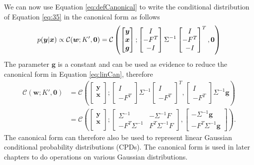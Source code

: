 \documentclass[12pt,oneside,openany,a4paper, %
afrikaans,english,
]{memoir}
\numberwithin{equation}{chapter}
\begin{document}
We can now use Equation \ref{eq:defCanonical} to write the conditional distribution of Equation \ref{eq:35} in the canonical form as follows
\begin{equation}\label{eq:linCan}
p(\bm{y}|\bm{x}) \propto \mathcal{C}(\bm{w}; K', \bm{0})\\
 =\mathcal{C}\left(
\begin{bmatrix}
\bm{y} \\
\bm{x} \\
\bm{g}
\end{bmatrix};
\begin{bmatrix}
I\\
-F^T\\
-I
\end{bmatrix}
\Sigma^{-1}
\begin{bmatrix}
I\\
-F^T\\
-I
\end{bmatrix}^T
, \bm{0}
\right)
\end{equation}
The parameter $\bm{g}$ is a constant and can be used as evidence to reduce the canonical form in Equation \ref{eq:linCan}, therefore
\begin{equation}\label{eq:conCanResult}
\begin{split}
\mathcal{C}(\bm{w}; K', \bm{0})& =\mathcal{C}\left(
\begin{bmatrix}
\bm{y} \\
\bm{x} \\
\end{bmatrix};
\begin{bmatrix}
I\\
-F^T
\end{bmatrix}
\Sigma^{-1}
\begin{bmatrix}
I\\
-F^T
\end{bmatrix}^T,
\begin{bmatrix}
I\\
-F^T
\end{bmatrix}
\Sigma^{-1}\bm{g}
\right)\\
& =\mathcal{C}\left(
\begin{bmatrix}
\bm{y} \\
\bm{x} \\
\end{bmatrix};
\begin{bmatrix}
\Sigma^{-1}  &  -\Sigma^{-1}F\\
-F^T\Sigma^{-1} & F^T\Sigma^{-1}F
\end{bmatrix}
, 
\begin{bmatrix}
-\Sigma^{-1}\bm{g}\\
-F^T\Sigma^{-1}\bm{g}
\end{bmatrix}
\right).
\end{split}
\end{equation}
The canonical form can therefore also be used to represent linear Gaussian conditional probability distributions (CPDs). The canonical form is used in later chapters to do operations on various Gaussian distributions.
\end{document}
